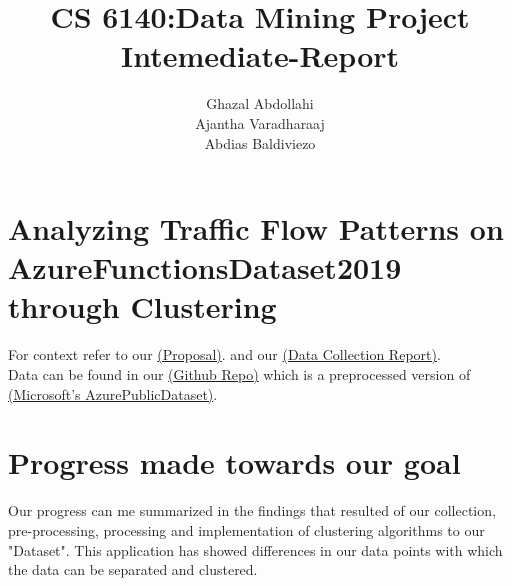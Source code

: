 \documentclass[11pt, fullpage,letterpaper]{article}
\title{CS 6140:Data Mining Project Intemediate-Report}
\author{Ghazal Abdollahi\\ Ajantha Varadharaaj\\ Abdias Baldiviezo}
\begin{document}
\maketitle





\section{Analyzing Traffic Flow Patterns on AzureFunctionsDataset2019 through Clustering}
\begin{flushleft}
For context refer to our \href{https://docs.google.com/document/d/1YZWRAKUY1-olLNxKiGHXPn6K3Xnj0rWkXE69JiJCMlA/edit?usp=sharing}{(Proposal)}.
and our \href{https://docs.google.com/document/d/1YZWRAKUY1-olLNxKiGHXPn6K3Xnj0rWkXE69JiJCMlA/edit?usp=sharing}{(Data Collection Report)}.\\
 Data can be found in our \href{https://github.com/Azure/AzurePublicDataset}{(Github Repo)} which is a preprocessed version of
\href{https://github.com/Azure/AzurePublicDataset/blob/master/AzureFunctionsDataset2019.md}{(Microsoft's AzurePublicDataset)}.

\end{flushleft}

\section{Progress made towards our goal}
\begin{flushleft}
Our progress can me summarized in the findings that resulted of our collection, pre-processing, processing and
implementation of clustering algorithms to our "Dataset". This application has showed differences in our data points
with which the data can be separated and clustered.
\end{flushleft}
\end{document}
